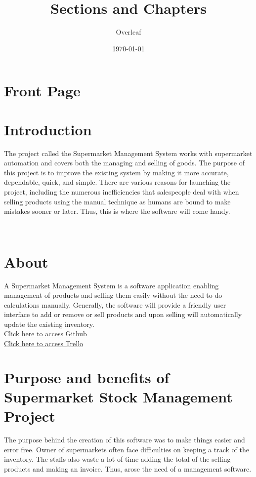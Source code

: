 \documentclass{article}
\title{Sections and Chapters}
\author{Overleaf}
\date{\today}
\begin{document}
{}
\section*{Front Page}
\pagebreak


{\Large \bf\tableofcontents}
{}

\pagebreak
{}
{}
\section*{\LARGE Introduction}
\large The project called the Supermarket Management System works with supermarket automation and covers both the managing and selling of goods. 
\newline
The purpose of this project is to improve the existing system by making it more accurate, dependable, quick, and simple. There are various reasons for launching the project, including the numerous inefficiencies that salespeople deal with when selling products using the manual technique as humans are bound to make mistakes sooner or later. Thus, this is where the software will come handy.

\\
{}
\section*{\LARGE About}
\large A Supermarket Management System is a software application enabling management of products and selling them easily without the need to do calculations manually.
\newline
Generally, the software will provide a friendly user interface to add or remove or sell products and upon selling will automatically update the existing inventory.
\newline
\large{\href{https://github.com/mahirshahriar1/CSE_215_Project}{\\Click here to access Github} }
\newline
\large{\href{https://trello.com/b/mirX8zh2/cse215project}{\\Click here to access Trello} }
\\
\section*{\LARGE Purpose and benefits of Supermarket Stock Management Project}
\large The purpose behind the creation of this software was to make things easier and error free. Owner of supermarkets often face difficulties on keeping a track of the inventory. The staffs also waste a lot of time adding the total of the selling products and making an invoice. Thus, arose the need of a management software.
\end{document}
